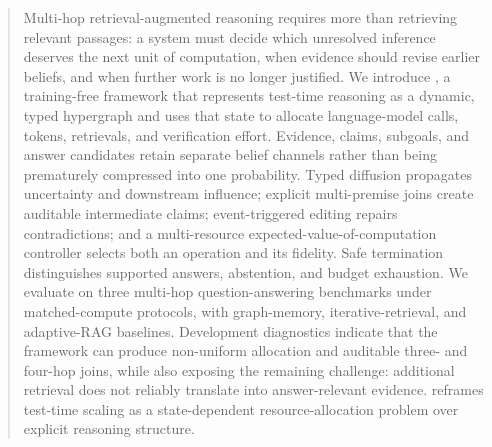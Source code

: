 \begin{abstract}
Multi-hop retrieval-augmented reasoning requires more than retrieving relevant passages: a system must decide which unresolved inference deserves the next unit of computation, when evidence should revise earlier beliefs, and when further work is no longer justified. We introduce \method, a training-free framework that represents test-time reasoning as a dynamic, typed hypergraph and uses that state to allocate language-model calls, tokens, retrievals, and verification effort. Evidence, claims, subgoals, and answer candidates retain separate belief channels rather than being prematurely compressed into one probability. Typed diffusion propagates uncertainty and downstream influence; explicit multi-premise joins create auditable intermediate claims; event-triggered editing repairs contradictions; and a multi-resource expected-value-of-computation controller selects both an operation and its fidelity. Safe termination distinguishes supported answers, abstention, and budget exhaustion. We evaluate \method{} on three multi-hop question-answering benchmarks under matched-compute protocols, with graph-memory, iterative-retrieval, and adaptive-RAG baselines.  Development diagnostics indicate that the framework can produce non-uniform allocation and auditable three- and four-hop joins, while also exposing the remaining challenge: additional retrieval does not reliably translate into answer-relevant evidence. \method{} reframes test-time scaling as a state-dependent resource-allocation problem over explicit reasoning structure.
\end{abstract}
